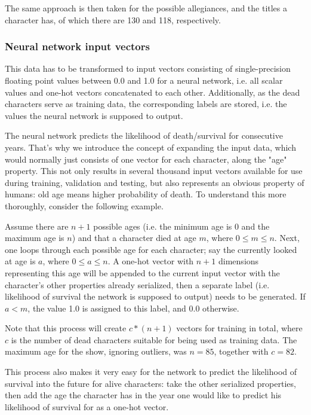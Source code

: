 \documentclass{bioinfo}
\begin{document}
The same approach is then taken for the possible allegiances, and the titles a character has, of which there are 130 and 118, respectively.

\subsubsection{Neural network input vectors}

This data has to be transformed to input vectors consisting of single-precision floating point values between 0.0 and 1.0 for a neural network, i.e. all scalar values and one-hot vectors concatenated to each other. Additionally, as the dead characters serve as training data, the corresponding labels are stored, i.e. the values the neural network is supposed to output.

The neural network predicts the likelihood of death/survival for consecutive years. That's why we introduce the concept of expanding the input data, which would normally just consists of one vector for each character, along the "age" property. This not only results in several thousand input vectors available for use during training, validation and testing, but also represents an obvious property of humans: old age means higher probability of death. To understand this more thoroughly, consider the following example.

Assume there are $n+1$ possible ages (i.e. the minimum age is $0$ and the maximum age is $n$) and that a character died at age $m$, where $0\leq m\leq n$. Next, one loops through each possible age for each character; say the currently looked at age is $a$, where $0\leq a\leq n$. A one-hot vector with $n+1$ dimensions representing this age will be appended to the current input vector with the character's other properties already serialized, then a separate label (i.e. likelihood of survival the network is supposed to output) needs to be generated. If $a<m$, the value 1.0 is assigned to this label, and 0.0 otherwise.

Note that this process will create $c*(n+1)$ vectors for training in total, where $c$ is the number of dead characters suitable for being used as training data. The maximum age for the show, ignoring outliers, was $n=85$, together with $c=82$.

This process also makes it very easy for the network to predict the likelihood of survival into the future for alive characters: take the other serialized properties, then add the age the character has in the year one would like to predict his likelihood of survival for as a one-hot vector.
\end{document}
